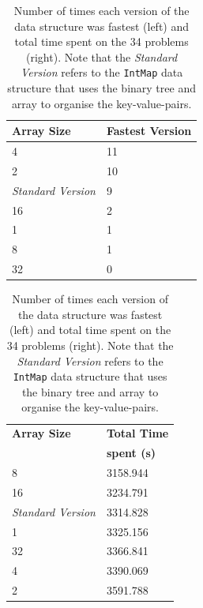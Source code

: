 \documentclass[]{ceurart}
\begin{document}
\begin{table}[h!]
  \centering
    \begin{minipage}{0.45\textwidth}
        \centering
        \begin{tabular}{l|l}
            \textbf{Array Size} & \textbf{Fastest Version} \\ \hline
            4 & 11 \\ \hline
            2 & 10 \\ \hline
            \textit{Standard Version} & 9 \\ \hline
            16 & 2 \\ \hline
            1 & 1 \\ \hline
            8 & 1 \\ \hline
            32 & 0 \\
        \end{tabular}
    \end{minipage}
    \begin{minipage}{0.45\textwidth}
        \centering
        \begin{tabular}{l|l}
            \textbf{Array Size} & \textbf{Total Time} \\
                                & \textbf{spent (s)} \\ \hline
            8 & 3158.944 \\ \hline
            16 & 3234.791 \\ \hline
            \textit{Standard Version} & 3314.828 \\ \hline
            1 & 3325.156 \\ \hline
            32 & 3366.841 \\ \hline
            4 & 3390.069 \\ \hline
            2 & 3591.788 \\
        \end{tabular}
    \end{minipage}
  \caption{Number of times each version of the data structure was fastest (left)
    and total time spent on the 34 problems (right). Note that the
    \textit{Standard Version} refers to the \texttt{IntMap} data
    structure that uses the binary tree and array to organise the
    key-value-pairs.
    }
  \label{fig:results}
\end{table}
\end{document}
